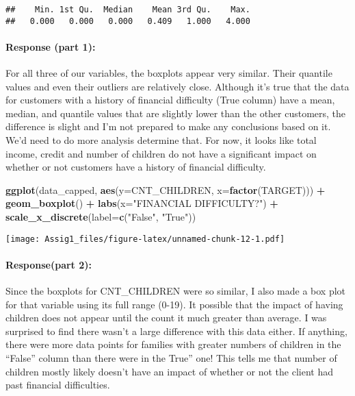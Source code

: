 \documentclass[
]{article}
\newenvironment{Shaded}{\begin{snugshade}}{\end{snugshade}}
\newcommand{\AttributeTok}[1]{\textcolor[rgb]{0.13,0.29,0.53}{#1}}
\newcommand{\FunctionTok}[1]{\textcolor[rgb]{0.13,0.29,0.53}{\textbf{#1}}}
\newcommand{\NormalTok}[1]{#1}
\newcommand{\SpecialCharTok}[1]{\textcolor[rgb]{0.81,0.36,0.00}{\textbf{#1}}}
\newcommand{\StringTok}[1]{\textcolor[rgb]{0.31,0.60,0.02}{#1}}
\begin{document}
\begin{verbatim}
##    Min. 1st Qu.  Median    Mean 3rd Qu.    Max. 
##   0.000   0.000   0.000   0.409   1.000   4.000
\end{verbatim}

\hypertarget{response-part-1-1}{%
\paragraph{Response (part 1):}\label{response-part-1-1}}

For all three of our variables, the boxplots appear very similar. Their
quantile values and even their outliers are relatively close. Although
it's true that the data for customers with a history of financial
difficulty (True column) have a mean, median, and quantile values that
are slightly lower than the other customers, the difference is slight
and I'm not prepared to make any conclusions based on it. We'd need to
do more analysis determine that. For now, it looks like total income,
credit and number of children do not have a significant impact on
whether or not customers have a history of financial difficulty.

\begin{Shaded}
\begin{Highlighting}[]
\FunctionTok{ggplot}\NormalTok{(data\_capped, }\FunctionTok{aes}\NormalTok{(}\AttributeTok{y=}\NormalTok{CNT\_CHILDREN, }\AttributeTok{x=}\FunctionTok{factor}\NormalTok{(TARGET))) }\SpecialCharTok{+}
  \FunctionTok{geom\_boxplot}\NormalTok{() }\SpecialCharTok{+}
  \FunctionTok{labs}\NormalTok{(}\AttributeTok{x=}\StringTok{"FINANCIAL DIFFICULTY?"}\NormalTok{) }\SpecialCharTok{+}
  \FunctionTok{scale\_x\_discrete}\NormalTok{(}\AttributeTok{label=}\FunctionTok{c}\NormalTok{(}\StringTok{"False"}\NormalTok{, }\StringTok{"True"}\NormalTok{))}
\end{Highlighting}
\end{Shaded}

\texttt{[image: Assig1\_files/figure-latex/unnamed-chunk-12-1.pdf]}

\hypertarget{responsepart-2}{%
\paragraph{Response(part 2):}\label{responsepart-2}}

Since the boxplots for CNT\_CHILDREN were so similar, I also made a box
plot for that variable using its full range (0-19). It possible that the
impact of having children does not appear until the count it much
greater than average. I was surprised to find there wasn't a large
difference with this data either. If anything, there were more data
points for families with greater numbers of children in the ``False''
column than there were in the True'' one! This tells me that number of
children mostly likely doesn't have an impact of whether or not the
client had past financial difficulties.
\end{document}
